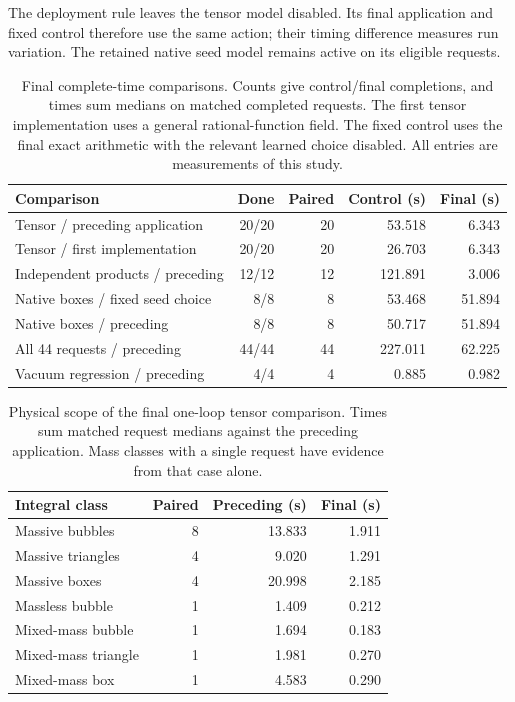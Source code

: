 The deployment rule leaves the tensor model disabled. Its final application and fixed control therefore use the same action; their timing difference measures run variation. The retained native seed model remains active on its eligible requests.

\begin{table}[!htbp]\centering\small
\caption{Final complete-time comparisons. Counts give control/final completions, and times sum medians on matched completed requests. The first tensor implementation uses a general rational-function field. The fixed control uses the final exact arithmetic with the relevant learned choice disabled. All entries are measurements of this study.}
\label{tab:tensor-results}
\begin{tabularx}{\linewidth}{@{}Yrrrr@{}}\toprule
Comparison & Done & Paired & Control (s) & Final (s)\\\midrule
Tensor / preceding application & 20/20 & 20 & 53.518 & 6.343 \\
Tensor / first implementation & 20/20 & 20 & 26.703 & 6.343 \\
Independent products / preceding & 12/12 & 12 & 121.891 & 3.006 \\
Native boxes / fixed seed choice & 8/8 & 8 & 53.468 & 51.894 \\
Native boxes / preceding & 8/8 & 8 & 50.717 & 51.894 \\
All 44 requests / preceding & 44/44 & 44 & 227.011 & 62.225 \\
Vacuum regression / preceding & 4/4 & 4 & 0.885 & 0.982 \\
\bottomrule\end{tabularx}\end{table}

\begin{table}[!htbp]\centering\small
\caption{Physical scope of the final one-loop tensor comparison. Times sum matched request medians against the preceding application. Mass classes with a single request have evidence from that case alone.}
\label{tab:tensor-types}
\begin{tabularx}{\linewidth}{@{}Yrrr@{}}\toprule
Integral class & Paired & Preceding (s) & Final (s)\\\midrule
Massive bubbles & 8 & 13.833 & 1.911 \\
Massive triangles & 4 & 9.020 & 1.291 \\
Massive boxes & 4 & 20.998 & 2.185 \\
Massless bubble & 1 & 1.409 & 0.212 \\
Mixed-mass bubble & 1 & 1.694 & 0.183 \\
Mixed-mass triangle & 1 & 1.981 & 0.270 \\
Mixed-mass box & 1 & 4.583 & 0.290 \\
\bottomrule\end{tabularx}\end{table}\FloatBarrier


